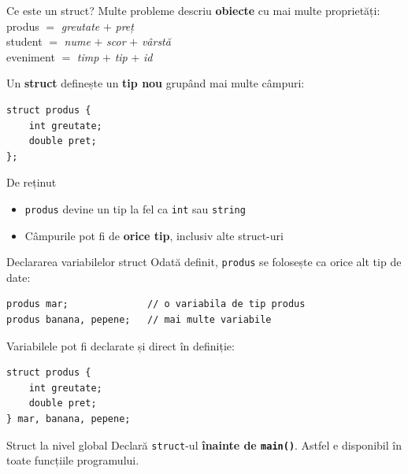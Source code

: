 ﻿\documentclass{beamer}
\begin{document}
\begin{frame}[fragile]{Ce este un struct?}
  Multe probleme descriu \textbf{obiecte} cu mai multe proprietăți: \\[6pt]
  \hspace{1cm} produs $=$ \emph{greutate} $+$ \emph{preț} \\
  \hspace{1cm} student $=$ \emph{nume} $+$ \emph{scor} $+$ \emph{vârstă} \\
  \hspace{1cm} eveniment $=$ \emph{timp} $+$ \emph{tip} $+$ \emph{id}

  \smallskip
  Un \textbf{struct} definește un \textbf{tip nou} grupând mai multe câmpuri:

  \begin{lstlisting}
struct produs {
    int greutate;
    double pret;
};
  \end{lstlisting}

  \begin{block}{De reținut}
    \begin{itemize}\itemsep2pt
      \item \texttt{produs} devine un tip la fel ca \texttt{int} sau \texttt{string}
      \item Câmpurile pot fi de \textbf{orice tip}, inclusiv alte struct-uri
    \end{itemize}
  \end{block}
\end{frame}

\begin{frame}[fragile]{Declararea variabilelor struct}
  Odată definit, \texttt{produs} se folosește ca orice alt tip de date:

  \begin{lstlisting}
produs mar;              // o variabila de tip produs
produs banana, pepene;   // mai multe variabile
  \end{lstlisting}

  \smallskip
  Variabilele pot fi declarate și direct în definiție:

  \begin{lstlisting}
struct produs {
    int greutate;
    double pret;
} mar, banana, pepene;
  \end{lstlisting}

  \begin{alertblock}{Struct la nivel global}
    Declară \texttt{struct}-ul \textbf{înainte de \texttt{main()}}.
    Astfel e disponibil în toate funcțiile programului.
  \end{alertblock}
\end{frame}
\end{document}
